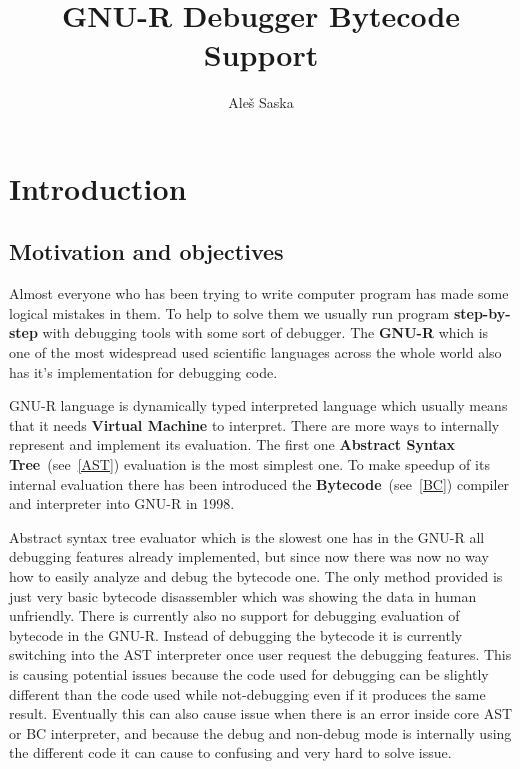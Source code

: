 \documentclass[thesis=M,english]{FITthesis}[2018/10/20]
\title{GNU-R Debugger Bytecode Support}
\author{Ale{\v s} Saska} %
\begin{document}


\chapter{Introduction}

\section{Motivation and objectives}

Almost everyone who has been trying to write computer program has made some logical mistakes in them. To help to solve them we usually run program \textbf{step-by-step} with debugging tools with some sort of debugger. The \mbox{\textbf{GNU-R}} which is one of the most widespread used scientific languages across the whole world also has it's implementation for debugging code.

GNU-R language is dynamically typed interpreted language which usually means that it needs \textbf{Virtual Machine} to interpret. There are more ways to internally represent and implement its evaluation. The first one \textbf{Abstract Syntax Tree}~(see~\ref{AST}) evaluation is the most simplest one. To make speedup of its internal evaluation there has been introduced the \textbf{Bytecode}~(see~\ref{BC}) compiler and interpreter into \mbox{GNU-R} in 1998.

Abstract syntax tree evaluator which is the slowest one has in the GNU-R all debugging features already implemented, but since now there was now no way how to easily analyze and debug the bytecode one. The only method provided is just very basic bytecode disassembler which was showing the data in human unfriendly. There is currently also no support for debugging evaluation of bytecode in the GNU-R. Instead of debugging the bytecode it is currently switching into the AST interpreter once user request the debugging features. This is causing potential issues because the code used for debugging can be slightly different than the code used while not-debugging even if it produces the same result. Eventually this can also cause issue when there is an error inside core AST or BC interpreter, and because the debug and non-debug mode is internally using the different code it can cause to confusing and very hard to solve issue.
\end{document}

